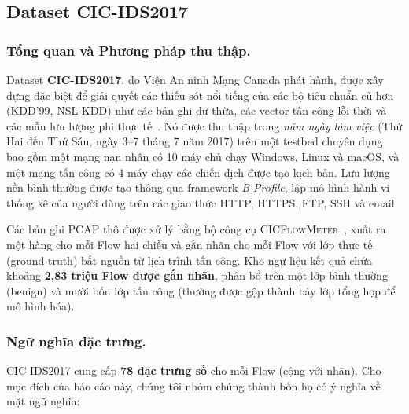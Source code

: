 \subsection{Dataset CIC-IDS2017}
\label{sec:bg-dataset}

\subsubsection*{Tổng quan và Phương pháp thu thập.}
Dataset \textbf{CIC-IDS2017}, do Viện An ninh Mạng Canada phát hành, được xây dựng đặc biệt để giải quyết các thiếu sót nổi tiếng của các bộ tiêu chuẩn cũ hơn (KDD'99, NSL-KDD) như các bản ghi dư thừa, các vector tấn công lỗi thời và các mẫu lưu lượng phi thực tế~\cite{ref_cicids2017,ref_kdd99}. Nó được thu thập trong \emph{năm ngày làm việc} (Thứ Hai đến Thứ Sáu, ngày 3--7 tháng 7 năm 2017) trên một testbed chuyên dụng bao gồm một mạng nạn nhân có 10 máy chủ chạy Windows, Linux và macOS, và một mạng tấn công có 4 máy chạy các chiến dịch được tạo kịch bản. Lưu lượng nền bình thường được tạo thông qua framework \emph{B-Profile}, lập mô hình hành vi thống kê của người dùng trên các giao thức HTTP, HTTPS, FTP, SSH và email.

Các bản ghi PCAP thô được xử lý bằng bộ công cụ \textsc{CICFlowMeter}~\cite{ref_cicflowmeter}, xuất ra một hàng cho mỗi Flow hai chiều và gắn nhãn cho mỗi Flow với lớp thực tế (ground-truth) bắt nguồn từ lịch trình tấn công. Kho ngữ liệu kết quả chứa khoảng \textbf{2,83 triệu Flow được gắn nhãn}, phân bổ trên một lớp bình thường (benign) và mười bốn lớp tấn công (thường được gộp thành bảy lớp tổng hợp để mô hình hóa).

\subsubsection*{Ngữ nghĩa đặc trưng.}
CIC-IDS2017 cung cấp \textbf{78 đặc trưng số} cho mỗi Flow (cộng với nhãn). Cho mục đích của báo cáo này, chúng tôi nhóm chúng thành bốn họ có ý nghĩa về mặt ngữ nghĩa:

